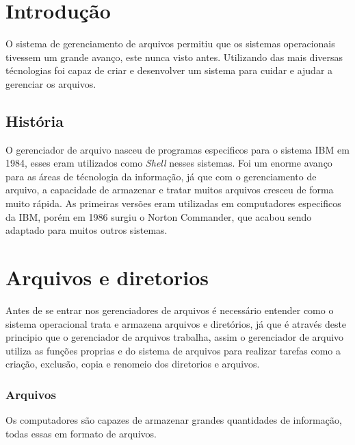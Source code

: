 \documentclass[
	12pt,				%
	openright,			%
	twoside,			%
	a4paper,			%
	chapter=TITLE,		%
	section=TITLE,		%
	english,	
	brazil				%
]{abntex2}
\begin{document}
\imprimircapa

\imprimirfolhaderosto

\tableofcontents

\maketitle

\chapter{Introdução}

O sistema de gerenciamento de arquivos permitiu que os sistemas operacionais tivessem um grande avanço, este nunca visto antes. Utilizando das mais diversas técnologias foi capaz de criar e desenvolver um sistema para cuidar e ajudar a gerenciar os arquivos.

\section{História}

O gerenciador de arquivo nasceu de programas especificos para o sistema IBM em 1984, esses eram utilizados como \textit{Shell} nesses sistemas. Foi um enorme avanço para as áreas de técnologia da informação, já que com o gerenciamento de arquivo, a capacidade de armazenar e tratar muitos arquivos cresceu de forma muito rápida. As primeiras versões eram utilizadas em computadores especificos da IBM, porém em 1986 surgiu o Norton Commander, que acabou sendo adaptado para muitos outros sistemas.

\chapter{Arquivos e diretorios}

Antes de se entrar nos gerenciadores de arquivos é necessário entender como o sistema operacional trata e armazena arquivos e diretórios, já que é através deste principio que o gerenciador de arquivos trabalha, assim o gerenciador de arquivo utiliza as funções proprias e do sistema de arquivos para realizar tarefas como a criação, exclusão, copia e renomeio dos diretorios e arquivos.

\subsection{Arquivos}

Os computadores são capazes de armazenar grandes quantidades de informação, todas essas em formato de arquivos.
\end{document}
